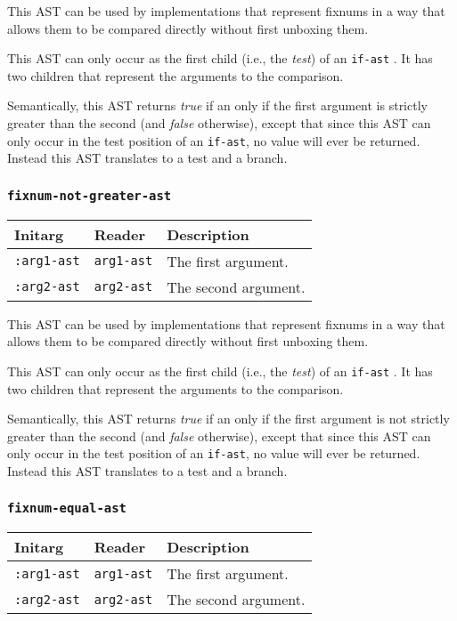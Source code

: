 This AST can be used by implementations that represent fixnums in a
way that allows them to be compared directly without first unboxing
them.

This AST can only occur as the first child (i.e., the \emph{test}) of
an \texttt{if-ast} .  It has two children that
represent the arguments to the comparison.  

Semantically, this AST returns \emph{true} if an only if the first
argument is strictly greater than the second (and \emph{false}
otherwise), except that since this AST can only occur in the test
position of an \texttt{if-ast}, no value will ever be returned.
Instead this AST translates to a test and a branch. 

\subsubsection{\texttt{fixnum-not-greater-ast}}
\label{fixnum-not-greater-ast}

\begin{tabular}{|l|l|l|}
\hline
Initarg & Reader & Description\\
\hline\hline
\texttt{:arg1-ast} & \texttt{arg1-ast} & The first argument.\\
\hline
\texttt{:arg2-ast} & \texttt{arg2-ast} & The second argument.\\
\hline
\end{tabular}

This AST can be used by implementations that represent fixnums in a
way that allows them to be compared directly without first unboxing
them.

This AST can only occur as the first child (i.e., the \emph{test}) of
an \texttt{if-ast} .  It has two children that
represent the arguments to the comparison.  

Semantically, this AST returns \emph{true} if an only if the first
argument is not strictly greater than the second (and \emph{false}
otherwise), except that since this AST can only occur in the test
position of an \texttt{if-ast}, no value will ever be returned.
Instead this AST translates to a test and a branch. 

\subsubsection{\texttt{fixnum-equal-ast}}
\label{fixnum-equal-ast}

\begin{tabular}{|l|l|l|}
\hline
Initarg & Reader & Description\\
\hline\hline
\texttt{:arg1-ast} & \texttt{arg1-ast} & The first argument.\\
\hline
\texttt{:arg2-ast} & \texttt{arg2-ast} & The second argument.\\
\hline
\end{tabular}

